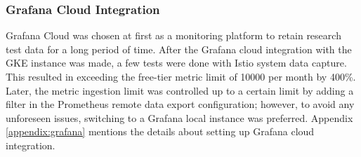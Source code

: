 \subsubsection{Grafana Cloud Integration}
Grafana Cloud was chosen at first as a monitoring platform to retain research test data for a long period of time. After the Grafana cloud integration with the GKE instance was made, a few tests were done with Istio system data capture. This resulted in exceeding the free-tier metric limit of 10000 per month by 400\%. Later, the metric ingestion limit was controlled up to a certain limit by adding a filter in the Prometheus remote data export configuration; however, to avoid any unforeseen issues, switching to a Grafana local instance was preferred. Appendix \ref{appendix:grafana} mentions the details about setting up Grafana cloud integration.